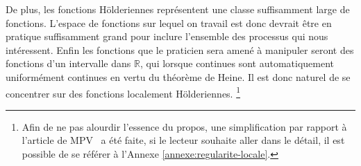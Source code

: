 De plus, les fonctions Hölderiennes représentent une classe suffisamment large de fonctions.
L'espace de fonctions sur lequel on travail est donc devrait être en pratique suffisamment grand pour inclure l'ensemble des processus qui nous intéressent. Enfin les fonctions que le praticien sera amené à manipuler seront des fonctions d'un intervalle dans $\mathds R$, qui lorsque continues sont automatiquement uniformément continues en vertu du théorème de Heine. Il est donc naturel de se concentrer sur des fonctions localement Hölderiennes. \footnote{Afin de ne pas alourdir l'essence du propos, une simplification par rapport à l'article de MPV~\cite{maissoro-SmoothnessFTSweakDep} a été faite, si le lecteur souhaite aller dans le détail, il est possible de se référer à l'Annexe \ref{annexe:regularite-locale}.}